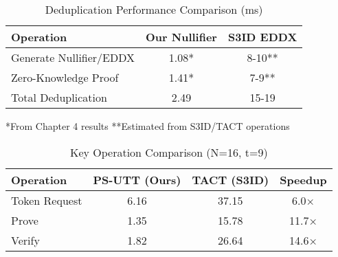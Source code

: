 \begin{table}[h]
\centering
\caption{Deduplication Performance Comparison (ms)}
\begin{tabular}{lcc}
\toprule
\textbf{Operation} & \textbf{Our Nullifier} & \textbf{S3ID EDDX} \\
\midrule
Generate Nullifier/EDDX & 1.08* & 8-10** \\
Zero-Knowledge Proof & 1.41* & 7-9** \\
Total Deduplication & 2.49 & 15-19 \\
\bottomrule
\end{tabular}
\footnotesize{*From Chapter 4 results **Estimated from S3ID/TACT operations}
\end{table}

\begin{table}[h]
\centering
\caption{Key Operation Comparison (N=16, t=9)}
\begin{tabular}{lccc}
\toprule
\textbf{Operation} & \textbf{PS-UTT (Ours)} & \textbf{TACT (S3ID)} & \textbf{Speedup} \\
\midrule
Token Request & 6.16 & 37.15 & 6.0× \\
Prove & 1.35 & 15.78 & 11.7× \\
Verify & 1.82 & 26.64 & 14.6× \\
\bottomrule
\end{tabular}
\end{table}